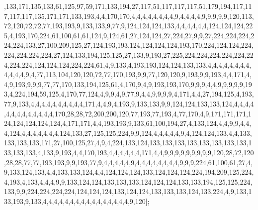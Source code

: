 ,133,171,135,133,61,125,97,59,171,133,194,27,117,51,117,117,117,51,179,194,117,117,117,117,135,171,171,133,193,4,4,170,170,4,4,4,4,4,4,4,4,9,4,4,4,4,9,9,9,9,9,120,113,72,120,72,72,77,193,193,9,133,133,9,77,9,124,124,124,133,4,4,4,4,4,4,124,124,124,225,4,193,170,224,61,100,61,61,124,9,124,61,27,124,124,27,224,27,9,9,27,224,224,224,224,224,133,27,100,209,125,27,124,193,193,124,124,124,124,193,170,224,124,124,224,224,224,224,224,27,124,133,194,125,125,27,133,9,193,27,225,224,224,224,224,224,224,224,224,124,124,124,224,224,61,4,9,133,4,193,193,124,124,133,133,4,4,4,4,4,4,4,4,4,4,4,4,9,4,77,113,104,120,120,72,77,170,193,9,9,77,120,120,9,193,9,9,193,4,4,171,4,4,9,193,9,9,9,77,77,170,133,194,125,61,4,170,9,4,9,193,193,170,9,9,9,4,4,9,9,9,9,9,193,4,224,194,59,125,4,170,77,124,4,9,9,4,9,77,9,4,4,9,9,9,9,4,171,4,4,27,194,125,4,193,77,9,133,4,4,4,4,4,4,4,4,4,4,171,4,4,9,4,193,9,133,133,9,9,124,124,133,133,124,4,4,4,4,4,4,4,4,4,4,4,4,4,170,28,28,72,200,200,120,77,193,77,193,4,77,170,4,9,171,171,171,124,124,124,124,124,4,171,171,4,4,193,193,9,133,61,100,194,27,4,133,124,4,4,9,9,4,4,4,124,4,4,4,4,4,4,4,124,133,27,125,125,224,9,9,124,4,4,4,4,4,9,4,124,124,133,4,4,133,133,133,133,171,27,100,125,27,4,9,4,224,133,124,133,133,133,133,133,133,133,133,133,133,133,4,133,9,193,4,4,170,193,4,4,4,4,4,4,171,4,4,9,9,9,9,9,9,9,9,9,120,28,72,120,28,28,77,77,193,193,9,9,193,77,9,4,4,4,4,4,9,4,4,4,4,4,4,4,4,9,9,9,224,61,100,61,27,4,9,133,124,133,4,4,133,133,124,4,4,124,124,124,133,124,124,124,224,194,209,125,224,4,193,4,133,4,4,4,9,9,133,124,124,133,133,133,124,124,124,133,133,194,125,125,224,133,9,9,224,224,224,224,124,124,124,133,124,124,133,133,133,124,133,224,4,9,133,133,193,9,133,4,4,4,4,4,4,4,4,4,4,4,4,4,4,4,4,9,120];




